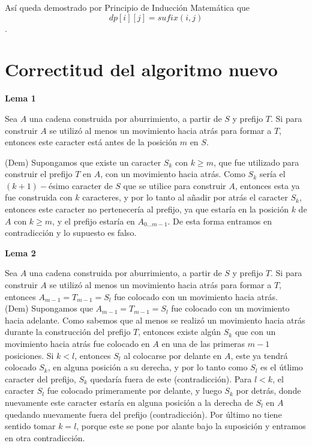 \documentclass[a4paper]{article}
\begin{document}
	Así queda demostrado por Principio de Inducción Matemática que $$dp[i][j]=sufix(i,j)$$.
	
	\section*{Correctitud del algoritmo nuevo}
	
	\textbf{Lema 1}
	
	Sea $A$ una cadena construida por aburrimiento, a partir de $S$ y prefijo $T$. Si para construir $A$ se utiliz\'o al menos un movimiento hacia atr\'as para formar a $T$, entonces este caracter está antes de la posición $m$ en $S$.
	
	(Dem) Supongamos que existe un caracter $S_k$ con $k \ge m$, que fue utilizado para construir el prefijo $T$ en $A$, con un movimiento hacia atrás. Como $S_k$ sería el $(k+1)-$ésimo caracter de $S$ que se utilice para construir $A$, entonces esta ya fue construida con $k$ caracteres, y por lo tanto al añadir por atrás el caracter $S_k$, entonces este caracter no pertenecería al prefijo, ya que estaría en la posición $k$ de $A$ con $k \ge m$, y el prefijo estaría en $A_{0...m-1}$. De esta forma entramos en contradicción y lo supuesto es falso.	
	
	\textbf{Lema 2}
	
	Sea $A$ una cadena construida por aburrimiento, a partir de $S$ y prefijo $T$.
	Si para construir $A$ se utiliz\'o al menos un movimiento hacia atr\'as para formar a $T$,
	entonces $A_{m-1} = T_{m-1} = S_{l}$ fue colocado con un movimiento hacia atr\'as. \\
	
	(Dem) Supongamos que $A_{m-1} = T_{m-1} = S_{l}$ fue colocado con un movimiento hacia adelante.
	Como sabemos que al menos se realiz\'o un movimiento hacia atr\'as durante la construcci\'on
	del prefijo $T$, entonces existe alg\'un $S_{k}$ que con un movimiento hacia atr\'as fue colocado
	en $A$ en una de las primeras $m-1$ posiciones. Si $k<l$, entonces $S_l$ al colocarse por delante
	en $A$, este ya tendr\'a colocado $S_k$, en alguna posici\'on a su derecha, y por lo tanto
	como $S_l$ es el \'utlimo caracter del prefijo, $S_k$ quedar\'ia fuera de este (contradicci\'on).
	Para $l<k$, el caracter $S_l$ fue colocado primeramente por delante, y luego $S_k$ por detr\'as,
	donde nuevamente este caracter estar\'ia en alguna posici\'on a la derecha de $S_l$ en $A$
	quedando nuevamente fuera del prefijo (contradicci\'on).
	Por \'ultimo no tiene sentido tomar $k=l$, porque este se pone por alante bajo la suposici\'on
	y entramos en otra contradicci\'on.\\
	
\end{document}
